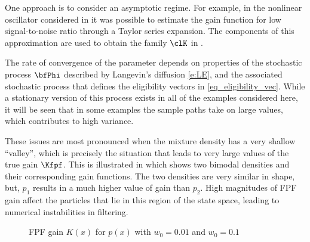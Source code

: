 One approach is to consider an asymptotic regime.  For example, in the nonlinear oscillator considered in \cite{yanmehmey13} it was possible to estimate the gain function for low signal-to-noise ratio through a Taylor series expansion.  The components of this approximation are used to obtain the family $\clK$ in
.

The rate of convergence of the parameter depends on properties of the stochastic process $\bfPhi$ described by Langevin's diffusion \eqref{e:LE},  and the associated stochastic process that defines the eligibility vectors  in \eqref{eq_eligibility_vec}.  While a stationary version of this process exists in all of the examples considered here,  it will be seen that in some examples the sample paths take on large values, which contributes to high variance.

These issues are most pronounced when the mixture density has a very shallow ``valley'', which is precisely the situation that leads to very large values of the true gain $\Kfpf$. This is illustrated in  which shows two bimodal densities and their corresponding gain functions. The two densities are very similar in shape, but, $p_{1}$ results in a much higher value of gain than $p_{2}$. High magnitudes of FPF gain affect the particles that lie in this region of the state space, leading to numerical instabilities in filtering.

\begin{figure}[h]
	\begin{center}
		\caption{FPF gain $K(x)$ for $p(x)$ with $w_{0}=0.01$ and $w_{0}=0.1$}
		\label{gain_comparison}
	\end{center}
\end{figure}

%

